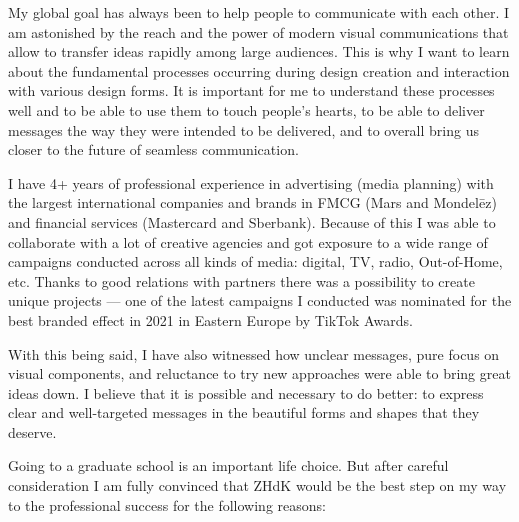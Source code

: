 \documentclass[11pt, a4paper]{awesome-cv}
\begin{document}
\makecvheader[R]



\makelettertitle

\begin{cvletter}

My global goal has always been to help people to communicate with each other. I am astonished by the reach and the power of modern visual communications that allow to transfer ideas rapidly among large audiences. This is why I want to learn about the fundamental processes occurring during design creation and interaction with various design forms. It is important for me to understand these processes well and to be able to use them to touch people's hearts, to be able to deliver messages the way they were intended to be delivered, and to overall bring us closer to the future of seamless communication.

I have 4+ years of professional experience in advertising (media planning) with the largest international companies and brands in FMCG (Mars and Mondelēz) and financial services (Mastercard and Sberbank). Because of this I was able to collaborate with a lot of creative agencies and got exposure to a wide range of campaigns conducted across all kinds of media: digital, TV, radio, Out-of-Home, etc. Thanks to good relations with partners there was a possibility to create unique projects --- one of the latest campaigns I conducted was nominated for the best branded effect in 2021 in Eastern Europe by TikTok Awards.

With this being said, I have also witnessed how unclear messages, pure focus on visual components, and reluctance to try new approaches were able to bring great ideas down. I believe that it is possible and necessary to do better: to express clear and well-targeted messages in the beautiful forms and shapes that they deserve.

Going to a graduate school is an important life choice. But after careful consideration I am fully convinced that ZHdK would be the best step on my way to the professional success for the following reasons:


\end{cvletter}
\end{document}
